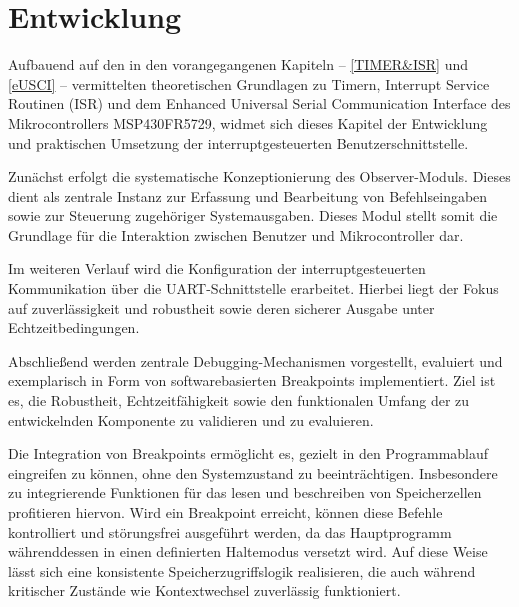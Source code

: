 

\chapter{Entwicklung}
\label{Entwicklung}

Aufbauend auf den in den vorangegangenen Kapiteln -- \ref{TIMER&ISR} und \ref{eUSCI} -- vermittelten theoretischen Grundlagen zu Timern, Interrupt Service Routinen (ISR) und dem Enhanced Universal Serial Communication Interface des Mikrocontrollers MSP430FR5729, widmet sich dieses Kapitel der Entwicklung und praktischen Umsetzung der interruptgesteuerten Benutzerschnittstelle.

Zun\"achst erfolgt die systematische Konzeptionierung des \glqq Observer-Moduls\grqq. Dieses dient als zentrale Instanz zur Erfassung und Bearbeitung von Befehlseingaben sowie zur Steuerung zugeh\"origer Systemausgaben. Dieses Modul stellt somit die Grundlage f\"ur die Interaktion zwischen Benutzer und Mikrocontroller dar.

Im weiteren Verlauf wird die Konfiguration der interruptgesteuerten Kommunikation \"uber die UART-Schnittstelle erarbeitet. Hierbei liegt der Fokus auf zuverl\"assigkeit und robustheit sowie deren sicherer Ausgabe unter Echtzeitbedingungen.

Abschlie{\ss}end werden zentrale Debugging-Mechanismen vorgestellt, evaluiert und exemplarisch in Form von softwarebasierten Breakpoints implementiert. Ziel ist es, die Robustheit, Echtzeitf\"ahigkeit sowie den funktionalen Umfang der zu entwickelnden Komponente zu validieren und zu evaluieren.

Die Integration von Breakpoints erm\"oglicht es, gezielt in den Programmablauf eingreifen zu k\"onnen, ohne den Systemzustand zu beeintr\"achtigen. Insbesondere zu integrierende Funktionen f\"ur das lesen und beschreiben von Speicherzellen profitieren hiervon. Wird ein Breakpoint erreicht, k\"onnen diese Befehle kontrolliert und st\"orungsfrei ausgef\"uhrt werden, da das Hauptprogramm w\"ahrenddessen in einen definierten Haltemodus versetzt wird. Auf diese Weise l\"asst sich eine konsistente Speicherzugriffslogik realisieren, die auch w\"ahrend kritischer Zust\"ande wie Kontextwechsel zuverl\"assig funktioniert.\AI


